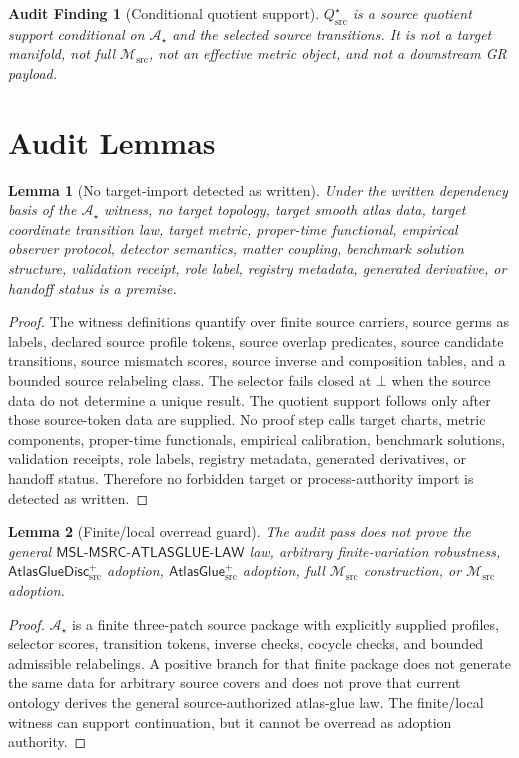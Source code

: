 \documentclass[11pt]{article}
\newcommand{\Msrc}{\mathcal{M}_{\mathrm{src}}}
\newcommand{\AtlasGlue}{\mathsf{AtlasGlue}_{\mathrm{src}}^{+}}
\newcommand{\AtlasGlueDisc}{\mathsf{AtlasGlueDisc}_{\mathrm{src}}^{+}}
\newcommand{\MSL}{\mathsf{MSL}\mbox{-}\mathsf{MSRC}\mbox{-}\mathsf{ATLASGLUE}\mbox{-}\mathsf{LAW}}
\newcommand{\Qstar}{Q_{\mathrm{src}}^{\star}}
\newcommand{\Bot}{\bot}
\newcommand{\Astar}{\mathcal A_{\star}}
\newtheorem{audit}{Audit Finding}
\newtheorem{lemma}{Lemma}
\begin{document}
\begin{audit}[Conditional quotient support]
\(\Qstar\) is a source quotient support conditional on \(\Astar\) and the
selected source transitions. It is not a target manifold, not full \(\Msrc\),
not an effective metric object, and not a downstream GR payload.
\end{audit}

\section{Audit Lemmas}

\begin{lemma}[No target-import detected as written]
Under the written dependency basis of the \(\Astar\) witness, no target
topology, target smooth atlas data, target coordinate transition law, target
metric, proper-time functional, empirical observer protocol, detector
semantics, matter coupling, benchmark solution structure, validation receipt,
role label, registry metadata, generated derivative, or handoff status is a
premise.
\end{lemma}

\begin{proof}
The witness definitions quantify over finite source carriers, source germs as
labels, declared source profile tokens, source overlap predicates, source
candidate transitions, source mismatch scores, source inverse and composition
tables, and a bounded source relabeling class. The selector fails closed at
\(\Bot\) when the source data do not determine a unique result. The quotient
support follows only after those source-token data are supplied. No proof step
calls target charts, metric components, proper-time functionals, empirical
calibration, benchmark solutions, validation receipts, role labels, registry
metadata, generated derivatives, or handoff status. Therefore no forbidden
target or process-authority import is detected as written.
\end{proof}

\begin{lemma}[Finite/local overread guard]
The audit pass does not prove the general \(\MSL\) law, arbitrary
finite-variation robustness, \(\AtlasGlueDisc\) adoption, \(\AtlasGlue\)
adoption, full \(\Msrc\) construction, or \(\Msrc\) adoption.
\end{lemma}

\begin{proof}
\(\Astar\) is a finite three-patch source package with explicitly supplied
profiles, selector scores, transition tokens, inverse checks, cocycle checks,
and bounded admissible relabelings. A positive branch for that finite package
does not generate the same data for arbitrary source covers and does not prove
that current ontology derives the general source-authorized atlas-glue law.
The finite/local witness can support continuation, but it cannot be overread
as adoption authority.
\end{proof}
\end{document}
